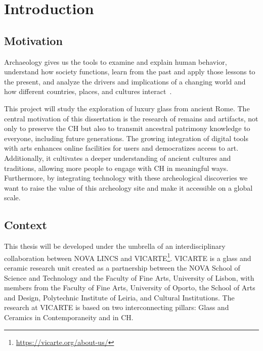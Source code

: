 
%

\chapter{Introduction}
\label{cha:introduction}


\section{Motivation}
\label{sec:motivation}
Archaeology gives us the tools to examine and explain human behavior, understand how 
society functions, learn from the past and apply those lessons to the present, and analyze
the drivers and implications of a changing world and how different countries, places, and cultures interact~\cite{oxfordarchaeology2025}.

This project will study the exploration of luxury glass from ancient Rome.
The central motivation of this dissertation is the research of remains and artifacts, not
only to preserve the \gls{CH} but also to transmit ancestral patrimony knowledge to everyone, including future generations. 
The growing integration of digital tools with arts enhances online 
facilities for users and democratizes access to art. Additionally, it cultivates a deeper understanding of ancient cultures and traditions, allowing more people to engage with
\gls{CH} in meaningful ways. Furthermore, by integrating technology with these archeological 
discoveries we want to raise the value of this archeology site and make it accessible on a global scale.


\section{Context}
\label{sec:context}

This thesis will be developed under the umbrella of an interdisciplinary collaboration between NOVA LINCS and \gls{VICARTE}\footnote{\url{https://vicarte.org/about-us/}}.
\gls{VICARTE} is a glass and ceramic research unit created as a partnership between the NOVA School of Science and Technology and the Faculty of Fine Arts, University of Lisbon, with members from the Faculty of Fine Arts, University of Oporto, the School of Arts and Design, Polytechnic Institute of Leiria, and Cultural Institutions.
The research at \gls{VICARTE} is based on two interconnecting pillars: Glass and Ceramics in Contemporaneity and in \gls{CH}. 

